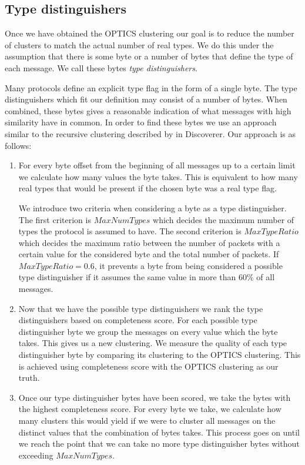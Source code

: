 \documentclass[a4paper]{report}
\begin{document}
\subsection{Type distinguishers}
Once we have obtained the OPTICS clustering our goal is to reduce the number of
clusters to match the actual number of real types. We do this under the
assumption that there is some byte or a number of bytes that define the type of
each message. We call these bytes \emph{type distinguishers}.

Many protocols define an explicit type flag in the form of a single byte. The
type distinguishers which fit our definition may consist of a number of bytes.
When combined, these bytes gives a reasonable indication of what messages with
high similarity have in common. In order to find these bytes we use an approach
similar to the recursive clustering described by \citeauthor{cui07} in
Discoverer. Our approach is as follows:

\begin{enumerate}
    \item For every byte offset from the beginning of all messages up to a certain limit
    we calculate how many values the byte takes. This is equivalent to how many
    real types that would be present if the chosen byte was a real type flag.

    We introduce two criteria when considering a byte as a type distinguisher.
    The first criterion is $MaxNumTypes$ which decides the maximum number of
    types the protocol is assumed to have. The second criterion is
    $MaxTypeRatio$ which decides the maximum ratio between the number of packets
    with a certain value for the considered byte and the total number of
    packets. If $MaxTypeRatio = 0.6$, it prevents a byte from being considered
    a possible type distinguisher if it assumes the same value in more than
    $60\%$ of all messages.

    \item Now that we have the possible type distinguishers we rank the type
    distinguishers based on completeness score. For each possible type
    distinguisher byte we group the messages on every value which the byte
    takes. This gives us a new clustering. We measure the quality of each type
    distinguisher byte by comparing its clustering to the OPTICS clustering.
    This is achieved using completeness score with the OPTICS clustering as our
    truth. 

    \item Once our type distinguisher bytes have been scored, we take the bytes
    with the highest completeness score. For every byte we take, we calculate
    how many clusters this would yield if we were to cluster all messages on
    the distinct values that the combination of bytes takes. This process goes
    on until we reach the point that we can take no more type distinguisher
    bytes without exceeding $MaxNumTypes$.
\end{enumerate}
\end{document}
